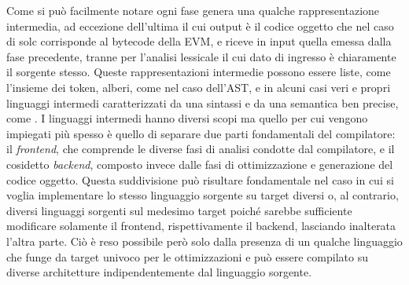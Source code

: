 \documentclass[12pt,a4paper,openright,oneside]{report}
\theoremstyle{definition}
\begin{document}
Come si pu\`{o} facilmente notare ogni fase genera una qualche rappresentazione intermedia, ad eccezione dell'ultima il cui output \`{e} il codice oggetto che nel caso di solc corrisponde al bytecode della EVM, e riceve in input quella emessa dalla fase precedente, tranne per l'analisi lessicale il cui dato di ingresso \`{e} chiaramente il sorgente stesso. Queste rappresentazioni intermedie possono essere liste, come l'insieme dei token, alberi, come nel caso dell'AST, e in alcuni casi veri e propri linguaggi intermedi caratterizzati da una sintassi e da una semantica ben precise, come \cite{llvmir}. I linguaggi intermedi hanno diversi scopi ma quello per cui vengono impiegati pi\`{u} spesso \`{e} quello di separare due parti fondamentali del compilatore: il \textit{frontend}, che comprende le diverse fasi di analisi condotte dal compilatore, e il cosidetto \textit{backend}, composto invece dalle fasi di ottimizzazione e generazione del codice oggetto. Questa suddivisione pu\`{o} risultare fondamentale nel caso in cui si voglia implementare lo stesso linguaggio sorgente su target diversi o, al contrario, diversi linguaggi sorgenti sul medesimo target poich\'{e} sarebbe sufficiente modificare solamente il frontend, rispettivamente il backend, lasciando inalterata l'altra parte. Ci\`{o} \`{e} reso possibile per\`{o} solo dalla presenza di un qualche linguaggio che funge da target univoco per le ottimizzazioni e pu\`{o} essere compilato su diverse architetture indipendentemente dal linguaggio sorgente.\\
\end{document}
